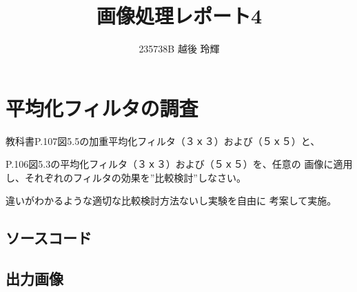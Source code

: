 \documentclass[a4paper,11pt,titlepage]{jsarticle}
\title{画像処理レポート4}
\author{235738B 越後 玲輝}
\begin{document}
\maketitle
\newpage

\section{平均化フィルタの調査}
教科書P.107図5.5の加重平均化フィルタ（３ｘ３）および（５ｘ５）と、


P.106図5.3の平均化フィルタ（３ｘ３）および（５ｘ５）を、任意の
画像に適用し、それぞれのフィルタの効果を”比較検討”しなさい。


違いがわかるような適切な比較検討方法ないし実験を自由に
考案して実施。

\subsection{ソースコード}
\begin{figure}[htbp]
\centering

\end{figure}

\begin{figure}[htbp]
\centering

\end{figure}


\clearpage

\subsection{出力画像}
\end{document}
